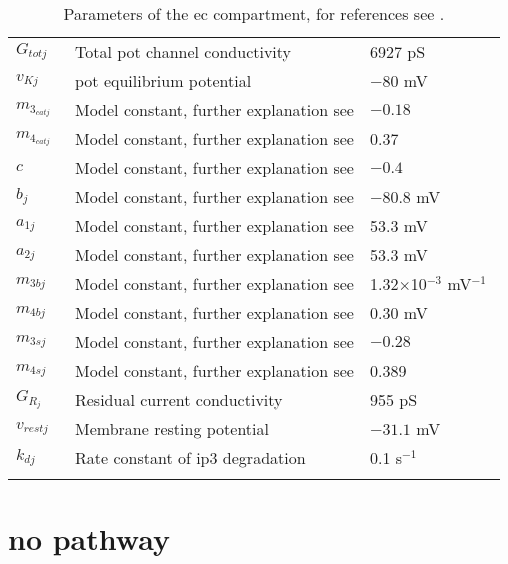 \documentclass[11pt]{elsarticle}
\newcommand{\n}{$^{-1}$\xspace}
\newcommand{\psec}{s$^{-1}$\xspace}
\newcommand{\pot}{\gls{pot}\xspace}
\newcommand{\ip}{\gls{ip3}\xspace}
\begin{document}
\begin{longtable}[h!]{ p{0.12\linewidth}   p{0.6\linewidth}   p{0.28\linewidth} }
$G_{totj}$      		& Total \pot channel conductivity	& 6927 pS \\
$v_{Kj}$      			& \pot equilibrium potential			& $-80$ mV	 \\
$m_{3_{catj}}$      	& Model constant, further explanation see \cite{Koenigsberger2006}		& $-0.18$	 \\
$m_{4_{catj}}$      	& Model constant, further explanation see \cite{Koenigsberger2006}		& 0.37	 \\
$c$      				& Model constant, further explanation see \cite{Koenigsberger2006}		& $-0.4$	 \\
$b_{j}$      			& Model constant, further explanation see \cite{Koenigsberger2006}		& $-80.8$ mV	 \\
$a_{1j}$      			& Model constant, further explanation see \cite{Koenigsberger2006}	& 53.3 mV \\
$a_{2j}$      			& Model constant, further explanation see \cite{Koenigsberger2006}		& 53.3 mV \\
$m_{3bj}$ & Model constant, further explanation see \cite{Koenigsberger2006} & 1.32$\times$10$^{-3}$ mV\n \\
$m_{4bj}$      			& Model constant, further explanation see \cite{Koenigsberger2006}		& 0.30 mV\\
$m_{3sj}$      			& Model constant, further explanation see \cite{Koenigsberger2006}	& $-0.28$	 \\
$m_{4sj}$      			& Model constant, further explanation see \cite{Koenigsberger2006}		& 0.389 \\
$G_{R_{j}}$      		& Residual current conductivity		& 955 pS		 \\
$v_{rest j}$      		& Membrane resting potential						 				& $-31.1$ mV	 \\
$k_{dj}$      			& Rate constant of \ip degradation						 		& 0.1 \psec \\
\hline
\caption{Parameters of the \gls{ec} compartment, for references see \citet{Dormanns2015}.}
\end{longtable}

\section{\Gls{no} pathway}
%
\end{document}
